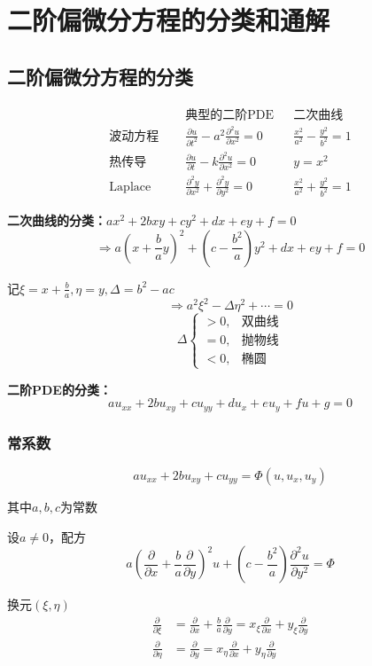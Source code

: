 \newpage
\section{二阶偏微分方程的分类和通解}
\subsection{二阶偏微分方程的分类}

$$\begin{aligned}
    &\text{典型的二阶PDE}&&\text{二次曲线}\\
    \text{波动方程 }\quad&\frac{\partial u}{\partial t^{2}}-a^{2}\frac{\partial^{2}u}{\partial x^{2}}=0&&\frac{x^{2}}{a^{2}}-\frac{y^{2}}{b^{2}}=1\\
    \text{热传导}\quad&\frac{\partial u}{\partial t}-k\frac{\partial^{2}u}{\partial x^{2}}=0&&y=x^{2}\\
    \text{Laplace}\quad&\frac{\partial^{2}y}{\partial x^{2}}+\frac{\partial^{2}y}{\partial y^{2}}=0&&\frac{x^{2}}{a^{2}}+\frac{y^{2}}{b^{2}}=1
\end{aligned}$$

\noindent\textbf{二次曲线的分类：}$ax^2+2bxy+cy^2+dx+ey+f=0$
$$\Rightarrow a(x+\frac{b}{a}y)^{2}+(c-\frac{b^{2}}{a})y^{2}+dx+ey+f=0$$

记$\xi=x+\frac{b}{a},\eta=y,\Delta=b^2-ac$
$$\Rightarrow a^2\xi^2-\Delta\eta^2+\cdots=0$$
$$\Delta\begin{cases}
>0,&\text{双曲线}\\
=0,&\text{抛物线}\\
<0,&\text{椭圆}
\end{cases}$$

\noindent\textbf{二阶PDE的分类：}
$$au_{xx}+2bu_{xy}+cu_{yy}+du_x+eu_y+fu+g=0$$



\subsubsection{常系数}
$$au_{xx}+2bu_{xy}+cu_{yy}=\Phi(u,u_x,u_y)$$

其中$a,b,c$为常数

设$a\ne0$，配方
$$
a\left(\frac{\partial}{\partial x}+\frac{b}{a}\frac{\partial}{\partial y}\right)^2u+\left(c-\frac{b^2}{a}\right)\frac{\partial^2u}{\partial y^2}=\Phi
$$

换元$(\xi,\eta)$
$$\begin{aligned}
    \frac{\partial}{\partial \xi}&=\frac{\partial}{\partial x}+\frac{b}{a}\frac{\partial}{\partial y}=x_{\xi}\frac{\partial}{\partial x}+y_{\xi}\frac{\partial}{\partial y}\\
    \frac{\partial}{\partial \eta}&=\frac{\partial}{\partial y}=x_{\eta}\frac{\partial}{\partial x}+y_{\eta}\frac{\partial}{\partial y}
\end{aligned}$$

